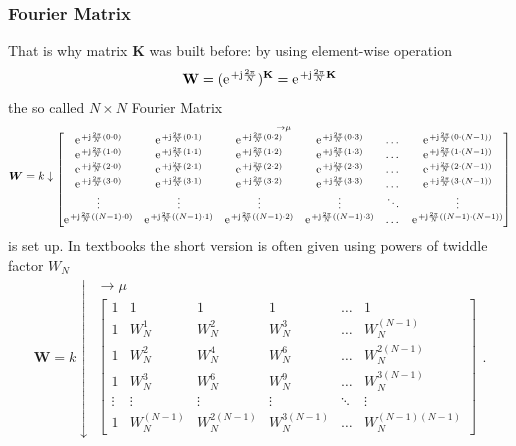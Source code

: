 \documentclass[11pt,a4paper,DIV=12]{scrartcl}
\begin{document}
\subsubsection{Fourier Matrix}
%
That is why matrix $\bm{K}$ was built before: by using element-wise operation
%
\begin{equation}
\mathbf{W} =
(\e^{+\im\frac{2\pi}{N}})^\mathbf{K} =
\e^{+\im\frac{2\pi}{N} \mathbf{K}}
\end{equation}
%
the so called
$N \times N$ Fourier Matrix
%
\begin{align}
\label{eq:FourierMatrix}
\bm{W} =
k \downarrow
\substack{\rightarrow \mu\\
\begin{bmatrix}
\e^{+\im\frac{2\pi}{N} (0 \cdot 0)} & \e^{+\im\frac{2\pi}{N} (0 \cdot 1)} & \e^{+\im\frac{2\pi}{N} (0 \cdot 2)} & \e^{+\im\frac{2\pi}{N} (0 \cdot 3)} & \dots & \e^{+\im\frac{2\pi}{N} (0 \cdot (N-1))}\\
\e^{+\im\frac{2\pi}{N} (1 \cdot 0)} & \e^{+\im\frac{2\pi}{N} (1 \cdot 1)} & \e^{+\im\frac{2\pi}{N} (1 \cdot 2)} & \e^{+\im\frac{2\pi}{N} (1 \cdot 3)} & \dots & \e^{+\im\frac{2\pi}{N} (1 \cdot (N-1))} \\
\e^{+\im\frac{2\pi}{N} (2 \cdot 0)} & \e^{+\im\frac{2\pi}{N} (2 \cdot 1)} & \e^{+\im\frac{2\pi}{N} (2 \cdot 2)} & \e^{+\im\frac{2\pi}{N} (2 \cdot 3)} & \dots & \e^{+\im\frac{2\pi}{N} (2 \cdot (N-1))}\\
\e^{+\im\frac{2\pi}{N} (3 \cdot 0)} & \e^{+\im\frac{2\pi}{N} (3 \cdot 1)} & \e^{+\im\frac{2\pi}{N} (3 \cdot 2)} & \e^{+\im\frac{2\pi}{N} (3 \cdot 3)} & \dots & \e^{+\im\frac{2\pi}{N} (3 \cdot (N-1))}\\
\vdots & \vdots & \vdots & \vdots & \ddots & \vdots\\
\e^{+\im\frac{2\pi}{N} ((N-1) \cdot 0)} & \e^{+\im\frac{2\pi}{N} ((N-1) \cdot 1)} & \e^{+\im\frac{2\pi}{N} ((N-1) \cdot 2)} & \e^{+\im\frac{2\pi}{N} ((N-1) \cdot 3)} & \dots &  \e^{+\im\frac{2\pi}{N} ((N-1) \cdot (N-1))}
\end{bmatrix}
}
\end{align}
is set up.
%
In textbooks the short version is often given using powers of twiddle factor $W_N$
\begin{align}
\bm{W} =
k \downarrow
\substack{\rightarrow \mu\\
\begin{bmatrix}
1 & 1 & 1 & 1 & \dots & 1\\[1em]
1 & W_N^1 & W_N^2 & W_N^3 & \dots & W_N^{(N-1)}\\[1em]
1 & W_N^2 & W_N^4 & W_N^6 & \dots & W_N^{2(N-1)}\\[1em]
1 & W_N^3 & W_N^6 & W_N^9 & \dots & W_N^{3(N-1)}\\[1em]
\vdots & \vdots & \vdots &\vdots &\ddots & \vdots\\[1em]
1 & W_N^{(N-1)} & W_N^{2(N-1)} & W_N^{3(N-1)} & \dots & W_N^{(N-1)(N-1)}
\end{bmatrix}
}.
\end{align}
\end{document}
